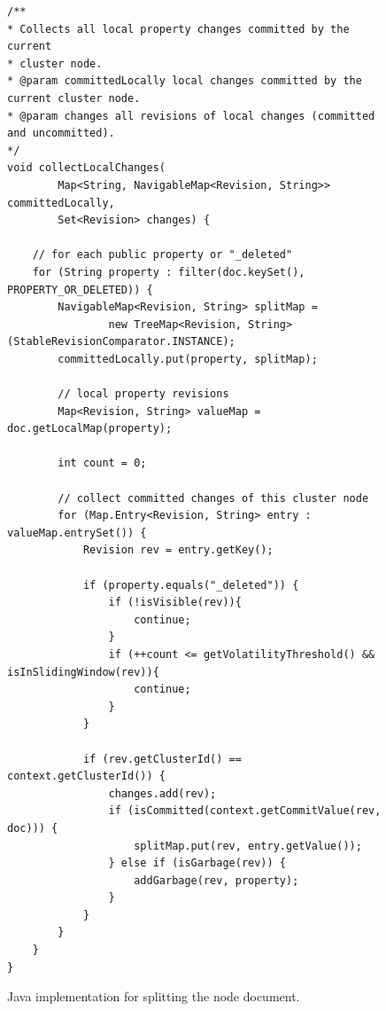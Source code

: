\documentclass[abstracton,12pt]{scrreprt}
\begin{document}
\begin{figure}[h]
    \begin{framed}
        \begin{scriptsize}
            \begin{verbatim}
/**
* Collects all local property changes committed by the current
* cluster node.
* @param committedLocally local changes committed by the current cluster node.
* @param changes all revisions of local changes (committed and uncommitted).
*/
void collectLocalChanges(
        Map<String, NavigableMap<Revision, String>> committedLocally,
        Set<Revision> changes) {

    // for each public property or "_deleted"
    for (String property : filter(doc.keySet(), PROPERTY_OR_DELETED)) {
        NavigableMap<Revision, String> splitMap =
                new TreeMap<Revision, String>(StableRevisionComparator.INSTANCE);
        committedLocally.put(property, splitMap);

        // local property revisions
        Map<Revision, String> valueMap = doc.getLocalMap(property);

        int count = 0;

        // collect committed changes of this cluster node
        for (Map.Entry<Revision, String> entry : valueMap.entrySet()) {
            Revision rev = entry.getKey();

            if (property.equals("_deleted")) {
                if (!isVisible(rev)){
                    continue;
                }
                if (++count <= getVolatilityThreshold() && isInSlidingWindow(rev)){
                    continue;
                }
            }

            if (rev.getClusterId() == context.getClusterId()) {
                changes.add(rev);
                if (isCommitted(context.getCommitValue(rev, doc))) {
                    splitMap.put(rev, entry.getValue());
                } else if (isGarbage(rev)) {
                    addGarbage(rev, property);
                }
            }
        }
    }
}
            \end{verbatim}
        \end{scriptsize}
    \end{framed}
    \caption{Java implementation for splitting the node document.}
    \label{algo:split_document}
\end{figure}
\end{document}
